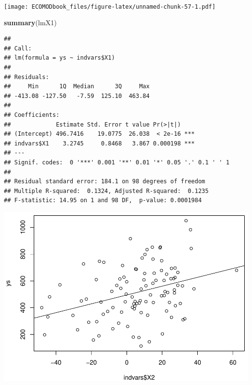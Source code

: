 \documentclass[
]{book}
\newenvironment{Shaded}{\begin{snugshade}}{\end{snugshade}}
\newcommand{\FunctionTok}[1]{\textcolor[rgb]{0.13,0.29,0.53}{\textbf{#1}}}
\newcommand{\NormalTok}[1]{#1}
\newcommand{\OtherTok}[1]{\textcolor[rgb]{0.56,0.35,0.01}{#1}}
\newcommand{\SpecialCharTok}[1]{\textcolor[rgb]{0.81,0.36,0.00}{\textbf{#1}}}
\begin{document}
\texttt{[image: ECOMODbook\_files/figure-latex/unnamed-chunk-57-1.pdf]}

\begin{Shaded}
\begin{Highlighting}[]
\FunctionTok{summary}\NormalTok{(lmX1)}
\end{Highlighting}
\end{Shaded}

\begin{verbatim}
## 
## Call:
## lm(formula = ys ~ indvars$X1)
## 
## Residuals:
##     Min      1Q  Median      3Q     Max 
## -413.08 -127.50   -7.59  125.10  463.84 
## 
## Coefficients:
##             Estimate Std. Error t value Pr(>|t|)    
## (Intercept) 496.7416    19.0775  26.038  < 2e-16 ***
## indvars$X1    3.2745     0.8468   3.867 0.000198 ***
## ---
## Signif. codes:  0 '***' 0.001 '**' 0.01 '*' 0.05 '.' 0.1 ' ' 1
## 
## Residual standard error: 184.1 on 98 degrees of freedom
## Multiple R-squared:  0.1324, Adjusted R-squared:  0.1235 
## F-statistic: 14.95 on 1 and 98 DF,  p-value: 0.0001984
\end{verbatim}

\begin{Shaded}
\end{Shaded}

\includegraphics{ECOMODbook_files/figure-latex/unnamed-chunk-57-2.pdf}
\end{document}
